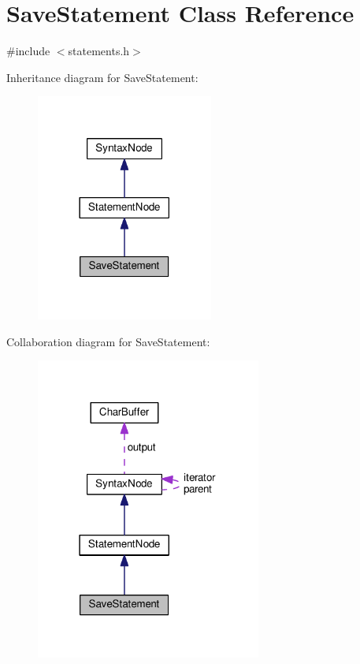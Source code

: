 \hypertarget{classSaveStatement}{}\section{Save\+Statement Class Reference}
\label{classSaveStatement}


{\ttfamily \#include $<$statements.\+h$>$}



Inheritance diagram for Save\+Statement\+:\nopagebreak
\begin{figure}[H]
\begin{center}
\leavevmode
\includegraphics[width=165pt]{classSaveStatement__inherit__graph}
\end{center}
\end{figure}


Collaboration diagram for Save\+Statement\+:\nopagebreak
\begin{figure}[H]
\begin{center}
\leavevmode
\includegraphics[width=210pt]{classSaveStatement__coll__graph}
\end{center}
\end{figure}

